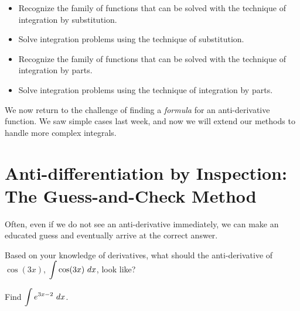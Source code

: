 



\setfont
\pagestyle{fancy}
\renewcommand{\Week}{5 }
\renewcommand{\WeekTitle}{\WeekTitleFive }

\fancyhead[LE,RO]{Week \Week}  %
\fancyfoot{}
\sectionbox{Week \#\Week: \WeekTitle}


\vspace{5mm}
\goals
\begin{itemize}
\item Recognize the family of functions that can be solved with the technique of
integration by substitution.
\item Solve integration problems using the technique of substitution. 
\item Recognize the family of functions that can be solved with the technique of
integration by parts. 
\item Solve integration problems using the technique of integration by parts. 
\end{itemize}
\vspace{5mm}




We now return to the challenge of finding a {\em formula} for an
anti-derivative function.  We saw simple cases last week, and now we
will extend our methods to handle more complex integrals.

\section*{Anti-differentiation by Inspection:\\ The Guess-and-Check Method}


\vsc

Often, even if we do not see an anti-derivative immediately, we can
make an educated guess and eventually arrive at the correct answer.

\vsc 

\newpage
\problem Based on your knowledge of derivatives, what should the
  anti-derivative of $\cos(3x)$, $\displaystyle \int \cos(3x) ~dx$, look like?

\vfill

\vfill

\newpage

\problem Find $\displaystyle \int e^{3x-2} ~dx$.

\vfill

\newpage

